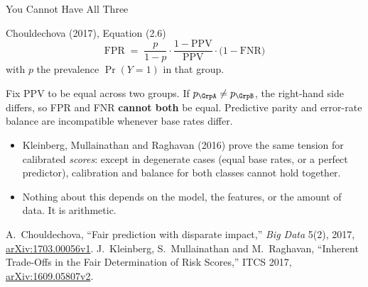 \begin{frame}[allowframebreaks]{You Cannot Have All Three}

    \begin{block}{Chouldechova (2017), Equation (2.6)}
        \[
            \text{FPR} \;=\; \frac{p}{1-p}\cdot\frac{1-\text{PPV}}{\text{PPV}}\cdot\bigl(1-\text{FNR}\bigr)
        \]
        with $p$ the prevalence $\Pr(Y=1)$ in that group.
    \end{block}

    \vspace{0.6em}

    Fix PPV to be equal across two groups. If $p_\GrpA \neq p_\GrpB$, the right-hand side differs,
    so FPR and FNR \textbf{cannot both} be equal. Predictive parity and error-rate balance are
    incompatible whenever base rates differ.

    \vspace{0.8em}

    \begin{itemize}\small
        \setlength\itemsep{0.35em}
        \item Kleinberg, Mullainathan and Raghavan (2016) prove the same tension for calibrated
              \emph{scores}: except in degenerate cases (equal base rates, or a perfect predictor),
              calibration and balance for both classes cannot hold together.
        \item Nothing about this depends on the model, the features, or the amount of data. It is
              arithmetic.
    \end{itemize}

    \vspace{0.3em}
    {\scriptsize A.~Chouldechova, ``Fair prediction with disparate impact,'' \emph{Big Data} 5(2), 2017,
    \href{https://arxiv.org/abs/1703.00056v1}{arXiv:1703.00056v1}. J.~Kleinberg, S.~Mullainathan and
    M.~Raghavan, ``Inherent Trade-Offs in the Fair Determination of Risk Scores,'' ITCS 2017,
    \href{https://arxiv.org/abs/1609.05807v2}{arXiv:1609.05807v2}.}
\end{frame}

